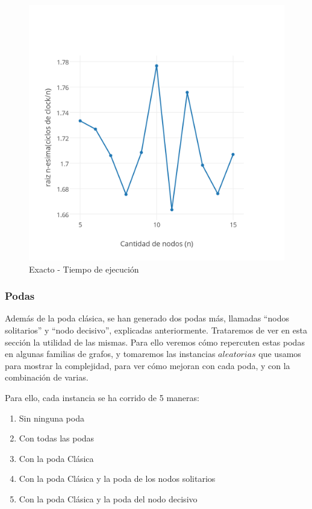 \begin{figure}[!htb]
\begin{center}
  \includegraphics[scale=0.7]{imagenes/exacto-tiempo-raiz.png}
\end{center}
  \caption{Exacto - Tiempo de ejecución}\label{fig:1B}
\endminipage
\end{figure}


\subsubsection{Podas}

Además de la poda clásica, se han generado dos podas más, llamadas ``nodos solitarios'' y ``nodo decisivo'', explicadas anteriormente. Trataremos de ver en esta sección la utilidad de las mismas. Para ello veremos cómo repercuten estas podas en algunas familias de grafos, y tomaremos las instancias $aleatorias$ que usamos para mostrar la complejidad, para ver cómo mejoran con cada poda, y con la combinación de varias.

Para ello, cada instancia se ha corrido de 5 maneras:

\begin{enumerate}
	\item Sin ninguna poda
	\item Con todas las podas 
	\item Con la poda Clásica
	\item Con la poda Clásica y la poda de los nodos solitarios
	\item Con la poda Clásica y la poda del nodo decisivo
\end{enumerate}


